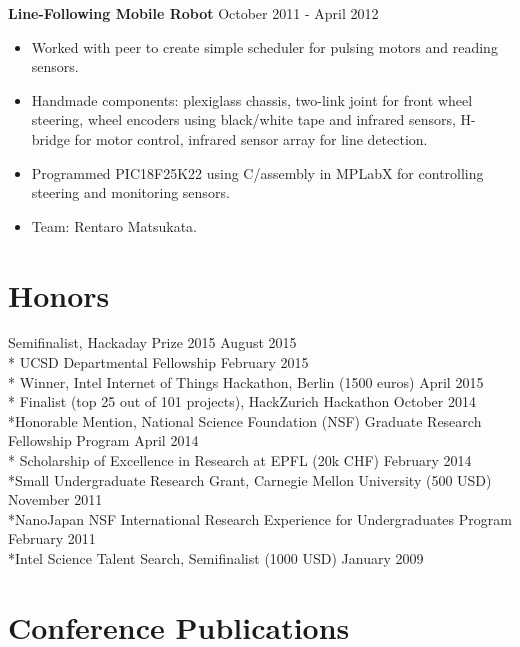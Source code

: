 \documentclass{res}
\begin{document}
    {\bf Line-Following Mobile Robot} \hfill October 2011 - April 2012
\begin{itemize}
    \item Worked with peer to create simple scheduler for pulsing motors and reading sensors.
    \item Handmade components: plexiglass chassis, two-link joint for front wheel steering, wheel encoders using black/white tape and infrared sensors, H-bridge for motor control, infrared sensor array for line detection. 
    \item Programmed PIC18F25K22 using C/assembly in MPLabX for controlling steering and monitoring sensors. 
    \item Team: Rentaro Matsukata.
\end{itemize}








  
\section{Honors} 
Semifinalist, Hackaday Prize 2015 \hfill August 2015
\\* UCSD Departmental Fellowship \hfill February 2015
\\* Winner, Intel Internet of Things Hackathon, Berlin (1500 euros) \hfill April 2015
\\* Finalist (top 25 out of 101 projects), HackZurich Hackathon \hfill October 2014
\\*Honorable Mention, National Science Foundation (NSF) Graduate Research Fellowship Program \hfill April 2014
\\* Scholarship of Excellence in Research at EPFL (20k CHF) \hfill February 2014
\\*Small Undergraduate Research Grant, Carnegie Mellon University (500 USD) \hfill November 2011
\\*NanoJapan NSF International Research Experience for Undergraduates Program \hfill February 2011
\\*Intel Science Talent Search, Semifinalist (1000 USD) \hfill January 2009




\vspace{-0.1in}
\section{Conference Publications}
\vspace{0.05in}
\end{document}
